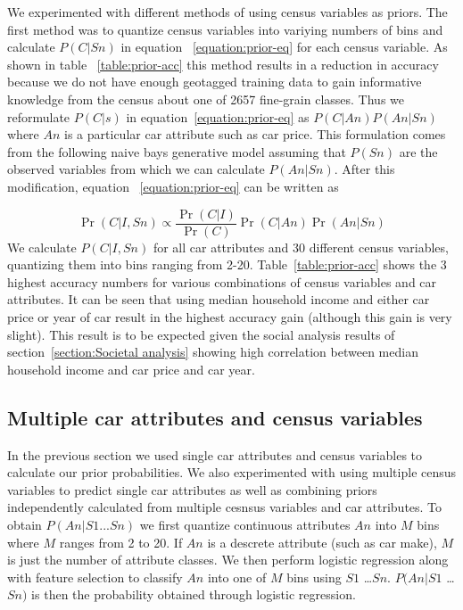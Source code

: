 \documentclass[10pt,twocolumn,letterpaper]{article}
\begin{document}
We experimented with different methods of using census variables as priors. The first method was to quantize census variables into variying numbers of bins and calculate \(P(C|Sn)\) in equation ~\ref{equation:prior-eq} for each census variable.
As shown in table ~\ref{table:prior-acc} this method results in a reduction in accuracy because we do not have enough geotagged training data to gain informative knowledge from the census about one of 2657 fine-grain classes. Thus we reformulate \(P(C|s)\) in equation~\ref{equation:prior-eq} as \(P(C|An)\)\(P(An|Sn)\) where \(An\) is a particular car attribute such as car price. This formulation comes from the following naive bays generative model assuming that \(P(Sn)\) are the observed variables from which we can calculate \(P(An|Sn)\). After this modification, equation ~\ref{equation:prior-eq} can be written as 

\begin{equation}
  \Pr(C|I,Sn) \propto \frac{\Pr(C|I)}{\Pr(C)}\Pr(C|An)\Pr(An|Sn)
\end{equation}
We calculate \(P(C|I,Sn)\) for all car attributes and 30 different census variables, quantizing them into bins ranging from 2-20. Table~\ref{table:prior-acc} shows the 3 highest accuracy numbers for various combinations of census variables and car attributes. It can be seen that using median household income and either car price or year of car result in the highest accuracy gain (although this gain is very slight). This result is to be expected given the social analysis results of section~\ref{section:Societal analysis} showing high correlation between median household income and car price and car year.


\subsection{Multiple car attributes and census variables}
In the previous section we used single car attributes and census variables to calculate our prior probabilities. We also experimented with using multiple census variables to predict single car attributes as well as combining priors independently calculated from multiple cesnsus variables and car attributes. To obtain \(P(An|S1...Sn)\) we first quantize continuous attributes \(An\) into \(M\) bins where \(M\) ranges from 2 to 20. If \(An\) is a descrete attribute (such as car make), \(M\) is just the number of attribute classes. We then perform logistic regression along with feature selection to classify \(An\) into one of \(M\) bins using \(S1\) \ldots \(Sn\). \(P(An|S1\) \ldots \(Sn)\) is then the probability obtained through logistic regression.
\end{document}
